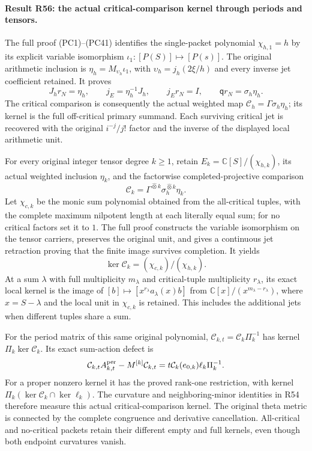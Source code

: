 \paragraph{Result R56: the actual critical-comparison kernel through periods and tensors.}
The full proof (PC1)--(PC41) identifies the single-packet polynomial
\(\chi_{h,1}=h\) by its explicit variable isomorphism
\(\iota_1:[P(S)]\mapsto[P(s)]\). The original arithmetic
inclusion is \(\eta_h=M_{\upsilon_h}\iota_1\), with
\(\upsilon_h=j_h(2\xi/h)\) and every inverse jet coefficient
retained. It proves
\[
 J_hr_N=\eta_h,\qquad j_E=\eta_h^{-1}J_h,\qquad
 j_Er_N=I,\qquad \mathsf q r_N=\sigma_h\eta_h.
\]
The critical comparison is consequently the actual weighted map
\(\mathcal C_h=\Gamma\sigma_h\eta_h\); its kernel is the full
off-critical primary summand. Each surviving critical jet is
recovered with the original \(i^{-j}/j!\) factor and the inverse
of the displayed local arithmetic unit.

For every original integer tensor degree \(k\ge1\), retain
\(E_k=\mathbb C[S]/(\chi_{h,k})\), its actual weighted inclusion
\(\eta_k\), and the factorwise completed-projective comparison
\[
 \mathcal C_k=
 \Gamma^{\widehat\otimes k}\sigma_h^{\widehat\otimes k}\eta_k.
\]
Let \(\chi_{c,k}\) be the monic sum polynomial obtained from the
all-critical tuples, with the complete maximum nilpotent length at
each literally equal sum; for no critical factors set it to \(1\).
The full proof constructs the variable isomorphism on the tensor
carriers, preserves the original unit, and gives a continuous jet
retraction proving that the finite image survives completion. It yields
\[
 \boxed{\ker\mathcal C_k=(\chi_{c,k})/(\chi_{h,k}).}
\]
At a sum \(\lambda\) with full multiplicity \(m_\lambda\) and
critical-tuple multiplicity \(r_\lambda\), its exact local kernel
is the image of
\([b]\mapsto[x^{r_\lambda}a_\lambda(x)b]\) from
\(\mathbb C[x]/(x^{m_\lambda-r_\lambda})\), where
\(x=S-\lambda\) and the local unit in \(\chi_{c,k}\) is retained.
This includes the additional jets when different tuples share a sum.

For the period matrix of this same original polynomial,
\(\mathcal C_{k,t}=\mathcal C_k\Pi_k^{-1}\) has kernel
\(\Pi_k\ker\mathcal C_k\). Its exact sum-action defect is
\[
 \mathcal C_{k,t}A_{k,t}^{\rm per}
       -M^{[k]}\mathcal C_{k,t}
   =t\mathcal C_k(e_{0,k})\ell_k\Pi_k^{-1}.
\]
For a proper nonzero kernel it has the proved rank-one restriction,
with kernel \(\Pi_k(\ker\mathcal C_k\cap\ker\ell_k)\).
The curvature and neighboring-minor identities in R54 therefore
measure this actual critical-comparison kernel. The original theta
metric is connected by the complete congruence and derivative
cancellation. All-critical and no-critical packets retain their
different empty and full kernels, even though both endpoint
curvatures vanish.

